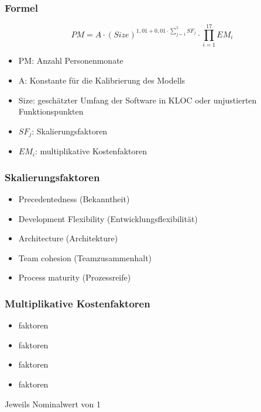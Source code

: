 \subsubsection{Formel}
\[PM=A \cdot (Size)^{1,01+0,01 \cdot \sum^{5}_{j=1}SF_j} \cdot \prod^{17}_{i=1}EM_i\]

\begin{itemize}
    \item PM: Anzahl Personenmonate
    \item A: Konstante für die Kalibrierung des Modells
    \item Size: geschätzter Umfang der Software in KLOC oder unjustierten Funktionspunkten
    \item $SF_j$: Skalierungsfaktoren
    \item $EM_i$: multiplikative Kostenfaktoren
\end{itemize}

\subsubsection{Skalierungsfaktoren}
\begin{itemize}
    \item Precedentedness (Bekanntheit)
    \item Development Flexibility (Entwicklungsflexibilität)
    \item Architecture (Architekture)
    \item Team cohesion (Teamzusammenhalt)
    \item Process maturity (Prozessreife)
\end{itemize}
\subsubsection{Multiplikative Kostenfaktoren}
\begin{itemize}
    \item {}faktoren
    \item {}faktoren
    \item {}faktoren
    \item {}faktoren
\end{itemize}
Jeweils Nominalwert von 1

